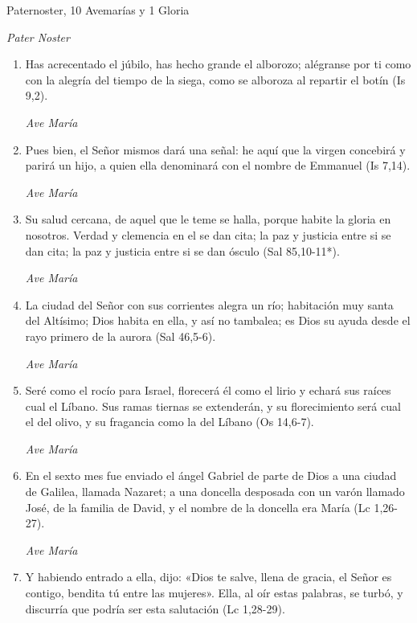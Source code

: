 \documentclass[a4paper,11pt, oneside]{report}
\begin{document}
         Paternoster, 10 Avemarías y 1 Gloria
        
        \textit{Pater Noster}

        \begin{enumerate}
          \item Has acrecentado el júbilo, has hecho grande el alborozo; alégranse por ti como con la alegría del tiempo de la siega, 
          como se alboroza al repartir el botín (Is 9,2).

          \textit{Ave María}

          \item Pues bien, el Señor mismos dará una señal: he aquí que la virgen concebirá y parirá un hijo, a quien ella denominará con el nombre de Emmanuel (Is 7,14).

          \textit{Ave María}

          \item Su salud cercana, de aquel que le teme se halla, porque habite la gloria en nosotros. Verdad y clemencia en el se dan cita;
          la paz y justicia entre si se dan cita; la paz y justicia entre si se dan ósculo (Sal 85,10-11*).

          \textit{Ave María}

          \item La ciudad del Señor con sus corrientes alegra un río; habitación muy santa del Altísimo; Dios habita en ella, y así no tambalea; es Dios
          su ayuda desde el rayo primero de la aurora (Sal 46,5-6).

          \textit{Ave María}

          \item Seré como el rocío para Israel, florecerá él como el lirio y echará sus raíces cual el Líbano. Sus ramas tiernas se extenderán,
          y su florecimiento será cual el del olivo, y su fragancia como la del Líbano (Os 14,6-7).

          \textit{Ave María}

          \item En el sexto mes fue enviado el ángel Gabriel de parte de Dios a una ciudad de Galilea, llamada Nazaret; a una doncella desposada con un varón
          llamado José, de la familia de David, y el nombre de la doncella era María (Lc 1,26-27).

          \textit{Ave María}

          \item Y habiendo entrado a ella, dijo: «Dios te salve, llena de gracia, el Señor es contigo, bendita tú entre las mujeres». Ella, al oír estas
          palabras, se turbó, y discurría que podría ser esta salutación (Lc 1,28-29).
          

\end{enumerate}
\end{document}
